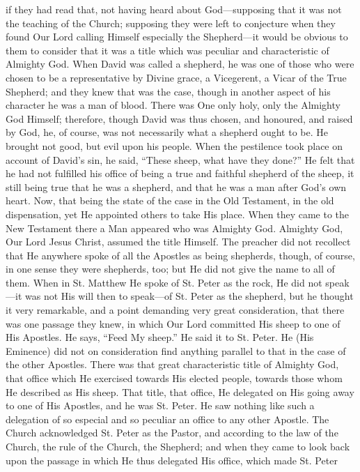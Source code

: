 if they had read that, not having heard about God—supposing that it
was not the teaching of the Church; supposing they were left to
conjecture when they found Our Lord calling Himself especially the
Shepherd—it would be obvious to them to consider that it was a title
which was peculiar and characteristic of Almighty God. When David was
called a shepherd, he was one of those who were chosen to be a
representative by Divine grace, a Vicegerent, a Vicar of the True
Shepherd; and they knew that was the case, though in another aspect of
his character he was a man of blood. There was One only holy, only the
Almighty God Himself; therefore, though David was thus chosen, and
honoured, and raised by God, he, of course, was not necessarily what a
shepherd ought to be. He brought not good, but evil upon his people.
When the pestilence took place on account of David's sin, he said, ``These
sheep, what have they done?'' He felt that he had not fulfilled
his office of being a true and faithful shepherd of the sheep, it
still being true that he was a shepherd, and that he was a man after
God's own heart. Now, that being the state of the case in the Old
Testament, in the old dispensation, yet He appointed others to take
His place. When they came to the New Testament there a Man appeared
who was Almighty God. Almighty God, Our Lord Jesus Christ, assumed the
title Himself. The preacher did not recollect that He anywhere spoke
of all the Apostles as being shepherds, though, of course, in one
sense they were shepherds, too; but He did not give the name to all of
them. When in St. Matthew He spoke of St. Peter as the rock, He did
not speak—it was not His will then to speak—of St. Peter as the
shepherd, but he thought it very remarkable, and a point demanding
very great consideration, that there was one passage they knew, in
which Our Lord committed His sheep to one of His Apostles. He says, ``Feed
My sheep.'' He said it to St. Peter. He (His Eminence) did not on
consideration find anything parallel to that in the case of the other
Apostles. There was that great characteristic title of Almighty God,
that office which He exercised towards His elected people, towards
those whom He described as His sheep. That title, that office, He
delegated on His going away to one of His Apostles, and he was St.
Peter. He saw nothing like such a delegation of so especial and so
peculiar an office to any other Apostle. The Church acknowledged St.
Peter as the Pastor, and according to the law of the Church, the rule
of the Church, the Shepherd; and when they came to look back upon the
passage in which He thus delegated His office, which made St. Peter
